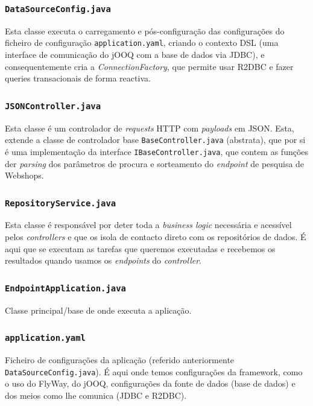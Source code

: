 \subsubsection*{\texttt{DataSourceConfig.java}}

Esta classe executa o carregamento e pós-configuração das configurações do ficheiro de configuração \texttt{application.yaml}, criando o contexto DSL (uma interface de comunicação do jOOQ com a base de dados via JDBC), e consequentemente cria a \textit{ConnectionFactory}, que permite usar R2DBC e fazer queries transacionais de forma reactiva.

\subsubsection*{\texttt{JSONController.java}}

Esta classe é um controlador de \textit{requests} HTTP com \textit{payloads} em JSON. Esta, extende a classe de controlador base \texttt{BaseController.java} (abstrata), que por si é uma implementação da interface \texttt{IBaseController.java}, que contem as funções der \textit{parsing} dos parâmetros de procura e sorteamento do \textit{endpoint} de pesquisa de Webshops.

\subsubsection*{\texttt{RepositoryService.java}}

Esta classe é responsável por deter toda a \textit{business logic} necessária e acessível pelos \textit{controllers} e que os isola de contacto direto com os repositórios de dados. É aqui que se executam as tarefas que queremos executadas e recebemos os resultados quando usamos os \textit{endpoints} do \textit{controller}.

\newpage

\subsubsection*{\texttt{EndpointApplication.java}}

Classe principal/base de onde executa a aplicação.

\subsubsection*{\texttt{application.yaml}}

Ficheiro de configurações da aplicação (referido anteriormente \texttt{DataSourceConfig.java}). É aqui onde temos configurações da framework, como o uso do FlyWay, do jOOQ, configurações da fonte de dados (base de dados) e dos meios como lhe comunica (JDBC e R2DBC).

